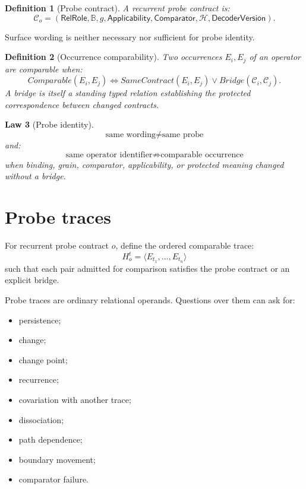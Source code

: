 \documentclass[11pt,oneside]{article}
\newtheorem{definition}{Definition}[section]
\newtheorem{law}[definition]{Law}
\newcommand{\B}{\mathbb B}
\begin{document}
\begin{definition}[Probe contract]
A recurrent probe contract is:
\[
\boxed{
\mathcal C_o=
(
\mathsf{RelRole},
\B,
g,
\mathsf{Applicability},
\mathsf{Comparator},
\mathcal H,
\mathsf{DecoderVersion}
).
}
\]
\end{definition}

Surface wording is neither necessary nor sufficient for probe identity.

\begin{definition}[Occurrence comparability]
Two occurrences \(E_i,E_j\) of an operator are comparable when:
\[
\boxed{
Comparable(E_i,E_j)
\iff
SameContract(E_i,E_j)
\lor
Bridge(\mathcal C_i,\mathcal C_j).
}
\]
A bridge is itself a standing typed relation establishing the protected correspondence between changed contracts.
\end{definition}

\begin{law}[Probe identity]
\[
\boxed{
\text{same wording}
\neq
\text{same probe}
}
\]
and:
\[
\boxed{
\text{same operator identifier}
\not\Rightarrow
\text{comparable occurrence}
}
\]
when binding, grain, comparator, applicability, or protected meaning changed without a bridge.
\end{law}

\section{Probe traces}

For recurrent probe contract \(o\), define the ordered comparable trace:
\[
\boxed{
H_o^t=
\langle E_{t_1},\ldots,E_{t_n}\rangle
}
\]
such that each pair admitted for comparison satisfies the probe contract or an explicit bridge.

Probe traces are ordinary relational operands.  Questions over them can ask for:
\begin{itemize}
\item persistence;
\item change;
\item change point;
\item recurrence;
\item covariation with another trace;
\item dissociation;
\item path dependence;
\item boundary movement;
\item comparator failure.
\end{itemize}
\end{document}
